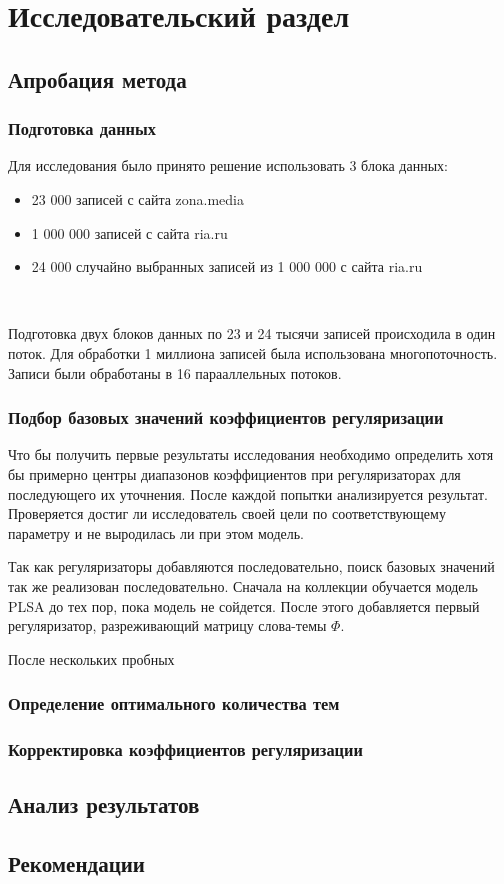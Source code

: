 \chapter{Исследовательский раздел}

%
\section{Апробация метода}

\subsection{Подготовка данных}

Для исследования было принято решение использовать 3 блока данных:

\begin{itemize}
    \item 23 000 записей с сайта zona.media
    \item 1 000 000 записей с сайта ria.ru
    \item 24 000 случайно выбранных записей из 1 000 000 с сайта ria.ru
\end{itemize}

~\

Подготовка двух блоков данных по 23 и 24 тысячи записей происходила в один поток. Для обработки 1 миллиона записей была использована многопоточность. Записи были обработаны в 16 парааллельных потоков.

\subsection{Подбор базовых значений коэффициентов регуляризации}

Что бы получить первые результаты исследования необходимо определить хотя бы примерно центры диапазонов коэффициентов при регуляризаторах для последующего их уточнения. После каждой попытки анализируется результат. Проверяется достиг ли исследователь своей цели по соответствующему параметру и не выродилась ли при этом модель.

Так как регуляризаторы добавляются последовательно, поиск базовых значений так же реализован последовательно. Сначала на коллекции обучается модель PLSA до тех пор, пока модель не сойдется. После этого добавляется первый регуляризатор, разреживающий матрицу слова-темы $\Phi$.

После нескольких пробных

\subsection{Определение оптимального количества тем}

\subsection{Корректировка коэффициентов регуляризации}

%
\section{Анализ результатов}

%
\section{Рекомендации}
